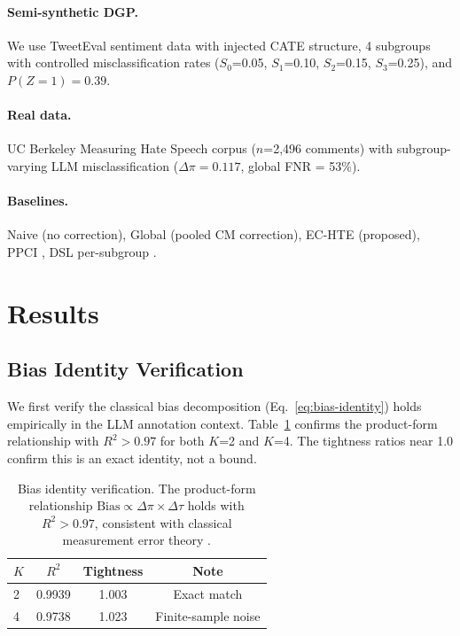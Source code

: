 \documentclass[11pt]{article}
\begin{document}
\paragraph{Semi-synthetic DGP.}
We use TweetEval sentiment data with injected CATE structure, 4 subgroups with controlled misclassification rates ($S_0$=0.05, $S_1$=0.10, $S_2$=0.15, $S_3$=0.25), and $P(Z=1) = 0.39$.

\paragraph{Real data.}
UC Berkeley Measuring Hate Speech corpus ($n$=2{,}496 comments) with subgroup-varying LLM misclassification ($\Delta\pi = 0.117$, global FNR = 53\%).

\paragraph{Baselines.}
Naive (no correction), Global (pooled CM correction), EC-HTE (proposed), PPCI \cite{sui2026ppci}, DSL per-subgroup \cite{egami2024using}.

\section{Results}

\subsection{Bias Identity Verification}
\label{sec:bias-identity}

We first verify the classical bias decomposition (Eq.~\ref{eq:bias-identity}) holds empirically in the LLM annotation context.
Table~\ref{tab:bias-identity} confirms the product-form relationship with $R^2 > 0.97$ for both $K$=2 and $K$=4.
The tightness ratios near 1.0 confirm this is an exact identity, not a bound.

\begin{table}[t]
\centering
\small
\begin{tabular}{lccc}
\toprule
$K$ & $R^2$ & Tightness & Note \\
\midrule
2 & 0.9939 & 1.003 & Exact match \\
4 & 0.9738 & 1.023 & Finite-sample noise \\
\bottomrule
\end{tabular}
\caption{Bias identity verification. The product-form relationship $\text{Bias} \propto \Delta\pi \times \Delta\tau$ holds with $R^2 > 0.97$, consistent with classical measurement error theory \cite{carroll2006measurement}.}
\label{tab:bias-identity}
\end{table}
\end{document}
